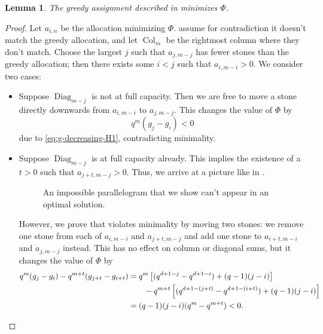 \documentclass[11pt]{amsart}
\newtheorem{lemma}[theorem]{Lemma}
\theoremstyle{definition}
\theoremstyle{remark}
\DeclareMathOperator{\Col}{Col}
\DeclareMathOperator{\Diag}{Diag}
\begin{document}
\begin{lemma}
  The greedy assignment described in  minimizes $\Phi$.
\end{lemma}
\begin{proof}
  Let $a_{i,n}$ be the allocation minimizing $\Phi$.
  assume for contradiction it doesn't match the greedy allocation,
  and let $\Col_m$ be the rightmost column where they don't match.
  Choose the largest $j$ such that $a_{j,m-j}$ has fewer stones than the greedy allocation;
  then there exists some $i < j$ such that $a_{i,m-i} > 0$.
  We consider two cases:
  \begin{itemize}
  \item Suppose $\Diag_{m-j}$ is not at full capacity.
  Then we are free to move a stone directly downwards from $a_{i,m-i}$ to $a_{j,m-j}$.
  This changes the value of $\Phi$ by
  \[ q^{m} (g_j - g_i) < 0 \]
  due to \eqref{eq:g-decreasing-H1}, contradicting minimality.

  \item Suppose $\Diag_{m-j}$ is at full capacity already.
  This implies the existence of a $t > 0$ such that $a_{j+t,m-j} > 0$.
  Thus, we arrive at a picture like in .

  \begin{figure}[b]
    \caption{An impossible parallelogram that we show can't appear in an optimal solution.}
    \label{fig:parallelogram}
  \end{figure}

  However, we prove that  violates minimality by moving two stones:
  we remove one stone from each of $a_{i,m-i}$ and $a_{j+t,m-j}$
  and add one stone to $a_{i+t,m-i}$ and $a_{j,m-j}$ instead.
  This has no effect on column or diagonal sums, but it changes the value of $\Phi$ by
  \begin{align*}
    q^{m} (g_j - g_i) - q^{m+t} (g_{j+t}-g_{i+t})
    &= q^m \left[ (q^{d+1-j} - q^{d+1-i}) + (q-1)(j-i) \right] \\
    &\qquad - q^{m+t} \left[ (q^{d+1-(j+t)} - q^{d+1-(i+t)}) + (q-1)(j-i) \right] \\
    &= (q-1)(j-i)(q^m-q^{m+t}) < 0. \qedhere
  \end{align*}
  \end{itemize}
\end{proof}
\end{document}
